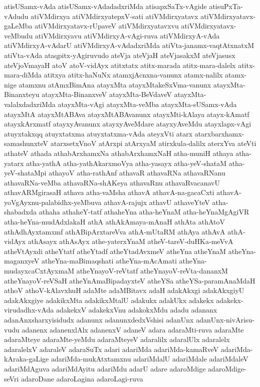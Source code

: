 {atisUSamx-vAda
atisUSamx-vAdadadxriMda
atisapxSaTx-vAgide
atisuPxTa-vAdudu
atiVMdirxya
atiVMdirxyatepxV-sati
atiVMdirxyatavx
atiVMdirxyatavx-gaLeMba
atiVMdirxyatavx-rUpaveV
atiVMdirxyatavxvu
atiVMdirxyatavx-veMbudu
atiVMdirxyavu
atiVMdirxyA-vAgi-ruva
atiVMdirxyA-vAda
atiVMdirxyA-vAdarU
atiVMdirxyA-vAdadxriMda
atiVta-janamx-vaqtAtxnatxM
atiVta-vAda
ataqpitx-yAgiruvudo
ateVja
ateVjaH
ateVjasakxM
ateVjasusx
ateVjoVmayaH
atoV
atoV-vidAyx
atitxtatx
atitx-marada
atitx-mara-dalelx
atitx-mara-diMda
atitxya
atitx-haNuNx
atamxjAcnxna-vanunx
atamx-nalilx
atamx-nige
atamxnu
atAmxBimAna
atayxMta
atayxMtakeSxVma-vanunx
atayxMta-Binanxteyu
atayxMta-BinanxveV
atayxMta-BeVdaveV
atayxMta-valalxdadxriMda
atayxMta-vAgi
atayxMta-veMba
atayxMta-sUSamx-vAda
atayxMtA
atayxMtABAva
atayxMtABAvanunx
atayxMti-kAlaya
atayx-kAmatf
atayxkArxmatf
atayxyAvanunx
atayxyAveMdare
atayxyAveMdu
atayxlapx-vAgi
atuyxtakxqq
atuyxtatxma
atuyxtatxma-vAda
ateyxVti
atarx
atarxbarxhamx-samashunxteV
atarxsetxVnoV
atArxpi
atArxyaM
atirxkula-dalilx
aterxYva
ateVti
athateV
athada
athabArxhamxNa
athabArxhamxNaH
atha-muniH
athaya
atha-yatarx
atha-yathA
atha-yathAkarxmoVya
atha-yasayx
atha-yeV-shataM
atha-yeV-shataMpi
athayoV
atha-rathAnf
athavaR
athavaRNa
athavaRNanu
athavaRNa-veMba
athavaRNa-shAKeya
athavaRnu
athavaRvacanavU
athavARMgirasaH
athava
atha-vaMsha
athavA
athavA-na-gacaCxti
athavA-yoVgAyxnu-palabidhx-yeMbuva
athavA-rajujx
athavU
athaveYteV
atha-shabadxda
athaha
athaheY-tatf
athaheYna
atha-heYnaM
atha-heYnaMgAgiVR
atha-heYna-mudAdxlakaH
athA
athAkAmaya-mAnaH
athAta
athAtoV
athAdhAyxtamxmf
athABipArxtareVva
athA-mUtaRM
athAya
athAvA
athA-vidAyx
athAsayx
athAsAyx
athe-yaterxYnaM
atheV-tareV-duHKa-meVvA
atheVtAyxdi
atheYtatf
atheYtadf
atheYtadAvxmeV
atheYna
atheYnaM
atheYna-maganxyeV
atheYna-maBimaqshati
atheYna-mAcAmati
atheYna-mudayxcaCxtAyxmaM
atheYnayoV-reVtatf
atheYnayoV-reVta-dananxM
atheYnayoV-reVSaH
atheYnAmaBipadayxteV
atheYSa
atheYSa-paramAnaMdaH
athoV
athoV-kAlavxhuH
adaMte
adaMBitavx
adaH
adakAkxgi
adakAkxgiyU
adakAkxgiye
adakikxMta
adakikxMtalU
adakukx
adakUkx
adakekx
adakekx-virudadhx-vAda
adakekxV
adakekxVnu
adakokxMdu
adadu
adananx
adanAnxsharxyisidudx
adanunx
adanunxdedxVshisi
adanUnx
adanUnx-nivArisu-vudu
adanenx
adanenxlAlx
adanenxV
adaneV
adara
adaraMti-ruva
adaraMte
adaraMteye
adaraMte-yeMdu
adaraMteyeV
adaralilx
adaralUlx
adaralelx
adaralelxV
adaraleV
adaraSuTx
adari
adariMda
adariMda-kamaRveV
adariMda-kAraka-gaLige
adariMda-mukAtxtamxnu
adariMdalU
adariMdale
adariMdaleV
adariMdAguva
adariMdAyitu
adariMdu
adarU
adare
adaroMdige
adaroMdige-seVri
adaroDane
adaroLagina
adaroLagi-ruva
}

